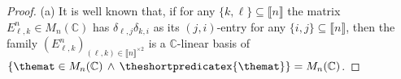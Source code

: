 \documentclass[10pt,a4paper]{amsart}
\numberwithin{equation}{section}
\newcommand{\Sand}{\,\wedge\,}
\newcommand{\comps}{\mathbb{C}}
\newcommand{\dwi}[1]{\llbracket{#1}\rrbracket}
\newcommand{\Ssetmonoidalproduct}{\times}
\newcommand{\squarematrices}[2]{M_{#1}(#2)}
\newcommand{\kron}[2]{\delta_{#1,#2}}
\newcommand{\thedim}{n}
\begin{document}
{  \begin{proof}
    \newcommand{\matb}[3]{E^{#1}_{#2,#3}}
    \newcommand{\indi}{i}
    \newcommand{\indj}{j}
    \newcommand{\indk}{k}
    \newcommand{\indl}{\ell}
    \newcommand{\inds}{s}
    \newcommand{\indt}{t}
    \newcommand{\smalliso}[1]{\varphi_{#1}}
    \newcommand{\smallisoinv}[1]{\psi_{#1}}
    \newcommand{\auxmat}{w}
    \newcommand{\auxmatx}[2]{\auxmat_{#1,#2}}
    \newcommand{\smallmat}{u}
    \newcommand{\smallmatx}[2]{\smallmat_{#1,#2}}
    \newcommand{\thematx}[2]{\themat_{#1,#2}}
    \newcommand{\othermat}{v'}
    \newcommand{\othermatx}[2]{\othermat_{#1,#2}}
    \newcommand{\ssmatb}[3]{T^{#1}_{#2,#3}}
    \newcommand{\indset}[1]{\Gamma_{#1}}
    \newcommand{\someind}{\gamma}
    \newcommand{\basismat}[2]{B^{#1}_{#2}}
    \newcommand{\scals}[1]{a_{#1}}
(a)
It is well known that, if for any $\{\indk,\indl\}\subseteq \dwi{n}$ the matrix $\matb{\thedim}{\indl}{\indk}\in \squarematrices{\thedim}{\comps}$ has $\kron{\indl}{\indj}\kron{\indk}{\indi}$ as its $(\indj,\indi)$-entry for any $\{\indi,\indj\}\subseteq \dwi{\thedim}$, then the family $(\matb{\thedim}{\indl}{\indk})_{(\indl,\indk)\in\dwi{\thedim}^{\Ssetmonoidalproduct 2}}$ is a $\comps$-linear basis of $\{\themat\in\squarematrices{\thedim}{\comps}\Sand \theshortpredicatex{\themat}\}=\squarematrices{\thedim}{\comps}$.


\end{proof}}
\end{document}
